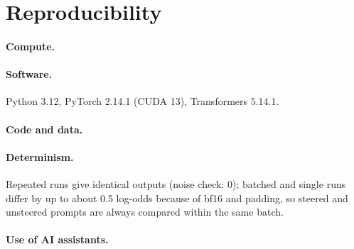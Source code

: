 \section{Reproducibility}
\label{app:repro}

\paragraph{Compute.} 

\paragraph{Software.} Python 3.12, PyTorch 2.14.1 (CUDA 13), Transformers 5.14.1.

\paragraph{Code and data.} 

\paragraph{Determinism.} Repeated runs give identical outputs (noise check: 0);
batched and single runs differ by up to about 0.5 log-odds because of bf16 and padding,
so steered and unsteered prompts are always compared within the same batch.

\paragraph{Use of AI assistants.} 
